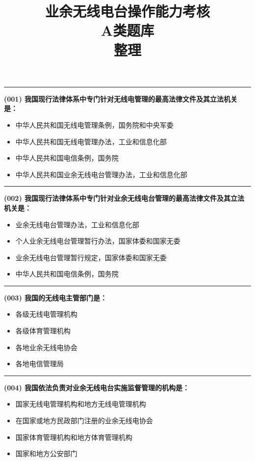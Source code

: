 \documentclass[twocolumn]{ctexart}  %
\title{业余无线电台操作能力考核\\A类题库\\整理}
\begin{document}
\maketitle


\noindent\rule{0.5\textwidth}{1pt}
\heiti \textbf{(001) 我国现行法律体系中专门针对无线电管理的最高法律文件及其立法机关是：} \songti {\color{gray} [LK0001] }
\begin{itemize}
	\item  中华人民共和国无线电管理条例，国务院和中央军委
	\item  中华人民共和国无线电管理办法，工业和信息化部
	\item  中华人民共和国电信条例，国务院
	\item  中华人民共和国业余无线电台管理办法，工业和信息化部
\end{itemize}


\noindent\rule{0.5\textwidth}{1pt}
\heiti \textbf{(002) 我国现行法律体系中专门针对业余无线电台管理的最高法律文件及其立法机关是：} \songti {\color{gray} [LK0002] }
\begin{itemize}
	\item  业余无线电台管理办法，工业和信息化部
	\item  个人业余无线电台管理暂行办法，国家体委和国家无委
	\item  业余无线电台管理暂行规定，国家体委和国家无委
	\item  中华人民共和国电信条例，国务院
\end{itemize}


\noindent\rule{0.5\textwidth}{1pt}
\heiti \textbf{(003) 我国的无线电主管部门是：} \songti {\color{gray} [LK0003] }
\begin{itemize}
	\item  各级无线电管理机构
	\item  各级体育管理机构
	\item  各地业余无线电协会
	\item  各地电信管理局
\end{itemize}


\noindent\rule{0.5\textwidth}{1pt}
\heiti \textbf{(004) 我国依法负责对业余无线电台实施监督管理的机构是：} \songti {\color{gray} [LK0004] }
\begin{itemize}
	\item  国家无线电管理机构和地方无线电管理机构
	\item  在国家或地方民政部门注册的业余无线电协会
	\item  国家体育管理机构和地方体育管理机构
	\item  国家和地方公安部门
\end{itemize}
\end{document}
